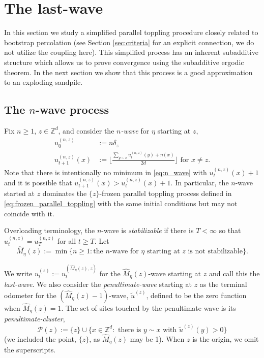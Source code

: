 \documentclass[aap]{imsart}
\newcommand{\Z}{\mathbb{Z}}
\begin{document}
\section{The last-wave}\label{sec:last_wave}
In this section we study a simplified parallel toppling procedure closely related to bootstrap percolation (see Section \ref{sec:criteria}
for an explicit connection, we do not utilize the coupling here). This simplified process has an inherent subadditive structure
which allows us to prove convergence using the subadditive ergodic theorem. In the next section we show that this process is a good approximation to an exploding sandpile. 


\subsection{\texorpdfstring{The $n$-wave process}{The n-wave process}} \label{subsec:n_wave}
Fix $n \geq 1$, $z \in \Z^d$, and consider the {\it $n$-wave} for $\eta$ starting at $z$,
\begin{equation} \label{eq:n_wave}
\begin{aligned}
u_0^{(n,z)} &:= n  \delta_z \\
u_{t+1}^{(n,z)}(x) &:= \lfloor \frac{ \sum_{y \sim x}  u_{t}^{(n,z)}(y) + \eta(x)}{2 d} \rfloor \mbox{ for $x \not= z$}.
\end{aligned}
\end{equation}
Note that there is intentionally no minimum in \eqref{eq:n_wave} with $u^{(n,z)}_t(x) + 1$
and it is possible that $u_{t+1}^{(n,z)}(x) > u_t^{(n,z)}(x) + 1$.
In particular, the $n$-wave started at $z$ dominates the $\{z\}$-frozen parallel toppling process defined in \eqref{eq:frozen_parallel_toppling} with the same initial conditions but may not coincide with it.

Overloading terminology, 
the $n$-wave is {\it stabilizable} if there is $T < \infty$
so that $u^{(n,z)}_{t} = u^{(n,z)}_{T}$ for all $t \geq T$. Let 
\begin{equation}
\hat{M}_{\eta}(z) := \min \{ n \geq 1 : \mbox{the $n$-wave for $\eta$ starting at $z$ is not stabilizable}\}.
\end{equation}


We write $u_t^{(z)} := u_t^{(\hat{M}_{\eta}(z),z)}$ for the $\hat{M}_{\eta}(z)$-wave starting at $z$ and call this the {\it last-wave}.  We also consider
the {\it penultimate-wave} starting at $z$ as the terminal odometer for the $(\hat{M}_{\eta}(z) - 1)$-wave, 
$\tilde{u}^{(z)}$, defined to be the zero function when $\hat{M}_{\eta}(z) = 1$. The set of sites touched by the penultimate wave is its {\it penultimate-cluster},
\begin{equation} \label{eq:penultimate_cluster}
\mathcal{P}(z) := \{z\} \cup \{ x \in \Z^d : \mbox{ there is $y \sim x$ with $\tilde{u}^{(z)}(y) > 0 $}\}
\end{equation}
(we included the point, $\{z\}$, as $\hat{M}_{\eta}(z)$ may be 1). When $z$ is the origin, we omit the superscripts. 
\end{document}
